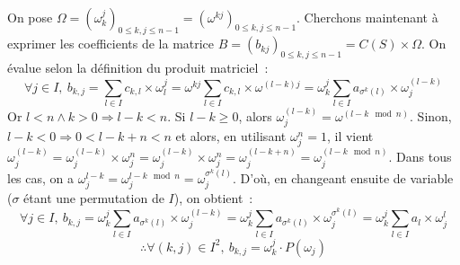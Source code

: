 \documentclass{article}
\begin{document}
  \paragraph{} On pose $\Omega = (\omega_k^j)_{0 \le k, j \le n - 1} = \left(\omega^{kj}\right)_{0 \le k, j \le n - 1}$. Cherchons maintenant à exprimer les coefficients de la matrice $B = (b_{kj})_{0 \le k, j \le n - 1} = C(S) \times \Omega$. On évalue selon la définition du produit matriciel~:
  \[
    \forall j\in I,\: b_{k, j} = \sum_{l\in I} c_{k,l} \times \omega_l^j = \omega^{kj} \sum_{l\in I} c_{k,l} \times \omega^{(l-k)j} = \omega_k^j \sum_{l\in I} a_{\sigma^k(l)} \times \omega_j^{(l-k)}
  \]
  Or $l < n \wedge k > 0 \Longrightarrow l - k < n$. Si $l - k \geq 0$, alors $\omega_j^{(l-k)} = \omega^{(l-k \mod n)}$. Sinon, $l-k < 0 \Longrightarrow 0 < l - k + n < n$ et alors, en utilisant $\omega_j^n = 1$, il vient $\omega_j^{(l-k)} = \omega_j^{(l-k)} \times \omega_j^n = \omega_j^{(l-k)} \times \omega_j^n = \omega_j^{(l-k+n)} = \omega_j^{(l-k \mod n)}$. Dans tous les cas, on a $\omega_j^{l-k} = \omega_j^{l - k \mod n} = \omega_j^{\sigma^k(l)}$. D'où, en changeant ensuite de variable ($\sigma$ étant une permutation de $I$), on obtient~:
  \[
    \forall j\in I,\: b_{k, j} = \omega_k^j \sum_{l\in I} a_{\sigma^k(l)} \times \omega_j^{(l-k)}
    = \omega_k^j \sum_{l\in I} a_{\sigma^k(l)} \times \omega_j^{\sigma^k(l)}
    = \omega_k^j \sum_{l\in I} a_l \times \omega_j^l
  \]
  \[
    \therefore\forall (k, j) \in I^2,\: b_{k,j} = \omega_k^j \cdot P(\omega_j)
  \]
\end{document}
